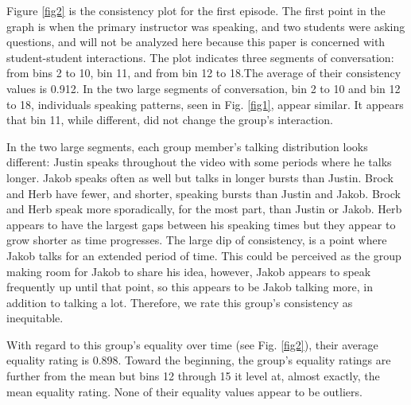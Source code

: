 \documentclass[aps,pra,reprint,noshowpacs,superscriptaddress, nofootinbib]{revtex4-1}
\begin{document}
Figure \ref{fig2} is the consistency plot for the first episode. The first point in the graph is when the primary instructor was speaking, and two students were asking questions, and will not be analyzed here because this paper is concerned with student-student interactions. The plot indicates three segments of conversation: from bins 2 to 10, bin 11, and from bin 12 to 18.The average of their consistency values is 0.912. In the two large segments of conversation, bin 2 to 10 and bin 12 to 18, individuals speaking patterns, seen in Fig. \ref{fig1}, appear similar. It appears that bin 11, while different, did not change the group's interaction.
% 
% 
% 
% 
% 
% 

   In the two large segments, each group member's talking distribution looks different: Justin speaks throughout the video with some periods where he talks longer. Jakob speaks often as well but talks in longer bursts than Justin. Brock and Herb have fewer, and shorter, speaking bursts than Justin and Jakob. Brock and Herb speak more sporadically, for the most part, than Justin or Jakob. Herb appears to have the largest gaps between his speaking times but they appear to grow shorter as time progresses. The large dip of consistency, is a point where Jakob talks for an extended period of time. This could be perceived as the group making room for Jakob to share his idea, however, Jakob appears to speak frequently up until that point, so this appears to be Jakob talking more, in addition to talking a lot. Therefore, we rate this group's consistency as inequitable.
% 
% 

   With regard to this group's equality over time (see Fig. \ref{fig2}), their average equality rating is 0.898. Toward the beginning, the group's equality ratings are further from the mean but bins 12 through 15 it level at, almost exactly, the mean equality rating. None of their equality values appear to be outliers.
\end{document}
